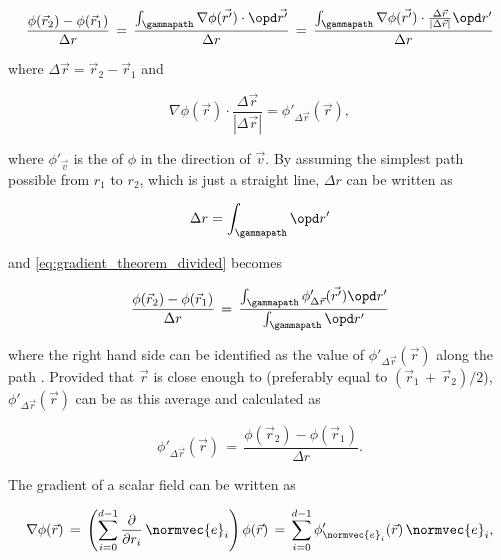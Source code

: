 \begin{equation} \label{eq:gradient_theorem_divided}
\frac{\phi(\vec{r}_2)-\phi(\vec{r}_1)}{\Delta r} \,=\, \frac{\int_\gammapath\nabla\phi(\vec{r'})\cdot \opd\vec{r'}}{\Delta r} \,=\, \frac{\int_\gammapath\nabla\phi(\vec{r'})\cdot\frac{\Delta\vec{r}}{|\Delta\vec{r}|} \opd r'}{\Delta r}
\end{equation}

where $\Delta\vec{r} = \vec{r}_2 -  \vec{r}_1$ and

\begin{equation}
\nabla\phi(\vec{r})\cdot\frac{\Delta\vec{r}}{|\Delta\vec{r}|} = \phi'_{\Delta\vec{r}}(\vec{r}),
\end{equation}

where $\phi'_{\vec{v}}$ is the \derivative of $\phi$ in the direction of $\vec{v}$. By assuming the simplest path possible from $r_1$ to $r_2$, which is just a straight line, $\Delta r$ can be written as

\begin{equation}
\Delta r = \int_\gammapath\opd r'
\end{equation}

and \eqref{eq:gradient_theorem_divided} becomes

\begin{equation} \label{eq:phi_derivative_integral}
\frac{\phi(\vec{r}_2)-\phi(\vec{r}_1)}{\Delta r} \,=\, \frac{\int_\gammapath\phi'_{\Delta\vec{r}}(\vec{r'})\opd r'}{\int_\gammapath\opd r'}
\end{equation}

where the right hand side can be identified as the \average value of $\phi'_{\Delta\vec{r}}(\vec{r})$ along the path \textgammapath. Provided that $\vec{r}$ is close enough to \textgammapath (preferably equal to \mbox{$(\vec{r}_1\,+\,\vec{r}_2)/2$}), $\phi'_{\Delta\vec{r}}(\vec{r})$ can be \approximated as this average and calculated as

\begin{equation} \label{eq:phi_derivative_final}
\phi'_{\Delta\vec{r}}(\vec{r}) \,=\, \frac{\phi(\vec{r}_2)-\phi(\vec{r}_1)}{\Delta r}.
\end{equation}

The gradient of a scalar field can be written as

\begin{equation} \label{eq:gradient_orthogonal}
\nabla\phi(\vec{r}) \,=\, \left(\sum_{i=0}^{d-1}\frac{\partial}{\partial r_i}\,\normvec{e}_i\right) \phi(\vec{r}) \,=\, \sum_{i=0}^{d-1}\phi'_{\normvec{e}_i}(\vec{r})\,\normvec{e}_i,
\end{equation}

